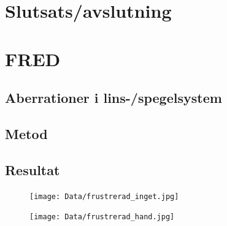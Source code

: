 \documentclass[a4paper]{article}
\begin{document}
  
  
  
  
  

\section{Slutsats/avslutning}

\section{FRED}


\subsection{Aberrationer i lins-/spegelsystem}



\subsection{Metod}



\subsection{Resultat}

\FloatBarrier

\begin{figure}[h]
	\centering
	\texttt{[image: Data/frustrerad\_inget.jpg]}
	\caption{}
	\label{fig:frustInget}
\end{figure}
\begin{figure}[h]
	\centering
	\texttt{[image: Data/frustrerad\_hand.jpg]}
	\caption{}
	\label{fig:frustHand}
\end{figure}
\end{document}
